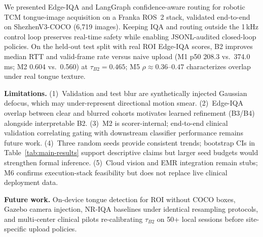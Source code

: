 We presented Edge-IQA and LangGraph confidence-aware routing for robotic TCM tongue-image acquisition on a Franka ROS~2 stack, validated end-to-end on ShezhenV3-COCO (6{,}719 images).
Keeping IQA and routing outside the 1\,kHz control loop preserves real-time safety while enabling JSONL-audited closed-loop policies.
On the held-out test split with real ROI Edge-IQA scores, B2 improves median RTT and valid-frame rate versus naive upload (M1 p50 208.3 vs.\ 374.0\,ms; M2 0.604 vs.\ 0.560) at $\tau_{B2}{=}0.465$; M5 $\rho{\approx}0.36$--$0.47$ characterizes overlap under real tongue texture.

\textbf{Limitations.} (1)~Validation and test blur are synthetically injected Gaussian defocus, which may under-represent directional motion smear.
(2)~Edge-IQA overlap between clear and blurred cohorts motivates learned refinement (B3/B4) alongside interpretable B2.
(3)~M2 is scorer-internal; end-to-end clinical validation correlating gating with downstream classifier performance remains future work.
(4)~Three random seeds provide consistent trends; bootstrap CIs in Table~\ref{tab:main-results} support descriptive claims but larger seed budgets would strengthen formal inference.
(5)~Cloud vision and EMR integration remain stubs; M6 confirms execution-stack feasibility but does not replace live clinical deployment data.

\textbf{Future work.} On-device tongue detection for ROI without COCO boxes, Gazebo camera injection, NR-IQA baselines under identical resampling protocols, and multi-center clinical pilots re-calibrating $\tau_{B2}$ on 50+ local sessions before site-specific upload policies.
